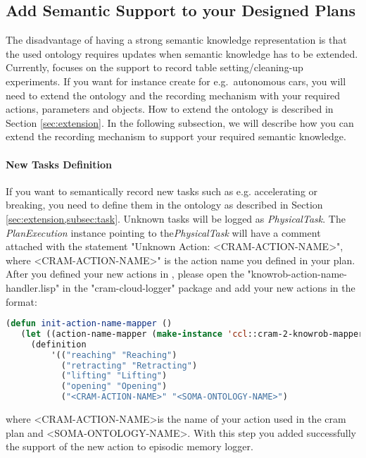 \subsection{Add Semantic Support to your Designed Plans}
The disadvantage of having a strong semantic knowledge representation is that the used ontology requires updates when semantic knowledge has to be extended. 
Currently, \soma focuses on the support to record table setting/cleaning-up experiments.
If you want for instance create \neems for e.g.\ autonomous cars, you will need to extend the \soma ontology and the recording mechanism with your required actions, parameters and objects.
How to extend the \soma ontology is described in Section \ref{sec:extension}.
In the following subsection, we will describe how you can extend the \cram recording mechanism to support your required semantic knowledge.

\paragraph{New Tasks Definition}
If you want to semantically record new tasks such as e.g. accelerating or breaking, you need to define them in the ontology as described in Section \ref{sec:extension,subsec:task}.
Unknown tasks will be logged as \textit{PhysicalTask}.
The \textit{PlanExecution} instance pointing to the\textit{PhysicalTask} will have a comment attached with the statement "Unknown Action: \textless CRAM-ACTION-NAME\textgreater", where \textless CRAM-ACTION-NAME\textgreater" is the action name you defined in your plan.
After you defined your new actions in \soma, please open the "knowrob-action-name-handler.lisp" in the "cram-cloud-logger" package and add your new actions in the format:

\begin{lstlisting}[language=lisp, caption=Linking the CRAM Action to the Ontology Concept]
(defun init-action-name-mapper ()
   (let ((action-name-mapper (make-instance 'ccl::cram-2-knowrob-mapper))
     (definition
         '(("reaching" "Reaching")
           ("retracting" "Retracting")
           ("lifting" "Lifting")
           ("opening" "Opening")
           ("<CRAM-ACTION-NAME>" "<SOMA-ONTOLOGY-NAME>")
\end{lstlisting}

where \textless CRAM-ACTION-NAME\textgreater is the name of your action used in the cram plan and \textless SOMA-ONTOLOGY-NAME\textgreater.
With this step you added successfully the support of the new action to \cram \neem episodic memory logger.

